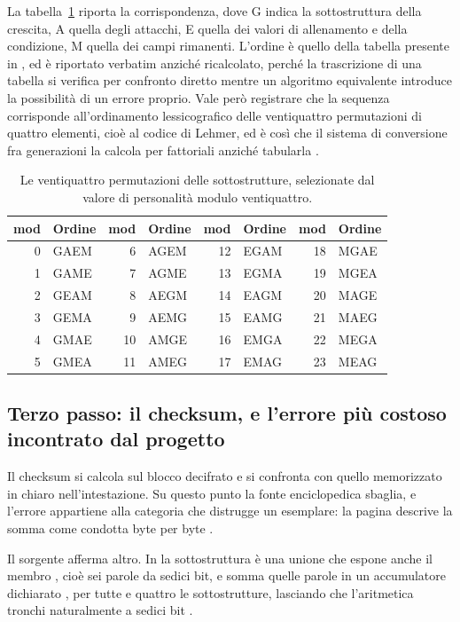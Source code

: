 La tabella~\ref{tab:perm} riporta la corrispondenza, dove G indica la sottostruttura della crescita, A quella degli attacchi, E quella dei valori di allenamento e della condizione, M quella dei campi rimanenti. L'ordine è quello della tabella presente in  \cite{pokeemerald}, ed è riportato verbatim anziché ricalcolato, perché la trascrizione di una tabella si verifica per confronto diretto mentre un algoritmo equivalente introduce la possibilità di un errore proprio. Vale però registrare che la sequenza corrisponde all'ordinamento lessicografico delle ventiquattro permutazioni di quattro elementi, cioè al codice di Lehmer, ed è così che il sistema di conversione fra generazioni la calcola per fattoriali anziché tabularla \cite{pccs}.

\begin{table}[htbp]
\centering
\caption{Le ventiquattro permutazioni delle sottostrutture, selezionate dal valore di personalità modulo ventiquattro.}\label{tab:perm}
\begin{tabular}{@{}rlrlrlrl@{}}
\toprule
mod & Ordine & mod & Ordine & mod & Ordine & mod & Ordine \\
\midrule
0 & GAEM & 6 & AGEM & 12 & EGAM & 18 & MGAE \\
1 & GAME & 7 & AGME & 13 & EGMA & 19 & MGEA \\
2 & GEAM & 8 & AEGM & 14 & EAGM & 20 & MAGE \\
3 & GEMA & 9 & AEMG & 15 & EAMG & 21 & MAEG \\
4 & GMAE & 10 & AMGE & 16 & EMGA & 22 & MEGA \\
5 & GMEA & 11 & AMEG & 17 & EMAG & 23 & MEAG \\
\bottomrule
\end{tabular}
\end{table}

\subsection{Terzo passo: il checksum, e l'errore più costoso incontrato dal progetto}

Il checksum si calcola sul blocco decifrato e si confronta con quello memorizzato in chiaro nell'intestazione. Su questo punto la fonte enciclopedica sbaglia, e l'errore appartiene alla categoria che distrugge un esemplare: la pagina descrive la somma come condotta byte per byte \cite{bulbapedia}.

Il sorgente afferma altro. In  la sottostruttura è una unione che espone anche il membro , cioè sei parole da sedici bit, e  somma quelle parole in un accumulatore dichiarato , per tutte e quattro le sottostrutture, lasciando che l'aritmetica tronchi naturalmente a sedici bit \cite{pokeemerald}.

